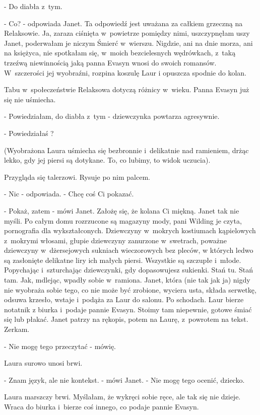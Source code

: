 \documentclass[oneside,polish,12pt,sfheadings]{mwbk}
\begin{document}
- Do diabła z~tym.

- Co? - odpowiada Janet. Ta odpowiedź jest uważana za całkiem grzeczną
na Relaksowie. Ja, zaraza ciśnięta w~powietrze pomiędzy nimi, uszczypnęłam
uszy Janet, poderwałam je niczym Śmierć w~wierszu. Nigdzie, ani na
dnie morza, ani na księżyca, nie spotkałam się, w~moich bezcielesnych
wędrówkach, z~taką trzeźwą niewinnością jaką panna Evasyn wnosi do
swoich romansów. W~szczerości jej wyobraźni, rozpina koszulę Laur
i opuszcza spodnie do kolan.

Tabu w~społeczeństwie Relaksowa dotyczą różnicy w~wieku. Panna Evasyn
już się nie uśmiecha.

- Powiedziałam, do diabła z~tym - dziewczynka powtarza agresywnie.

- Powiedziałaś ?

(Wyobrażona Laura uśmiecha się bezbronnie i~delikatnie nad ramieniem,
drżąc lekko, gdy jej piersi są dotykane. To, co lubimy, to widok uczucia).

Przygląda się talerzowi. Rysuje po nim palcem. 

- Nic - odpowiada. - Chcę coś Ci pokazać.

- Pokaż, zatem - mówi Janet. Założę się, że kolana Ci miękną. Janet
tak nie myśli. Po całym domu rozrzucone są magazyny mody, pani Wilding
je czyta, pornografia dla wykształconych. Dziewczyny w~mokrych kostiumach
kąpielowych z~mokrymi włosami, głupie dziewczyny zanurzone w~swetrach,
poważne dziewczyny w~dżersejowych sukniach wieczorowych bez pleców,
w których ledwo są zasłonięte delikatne liry ich małych piersi. Wszystkie
są szczupłe i~młode. Popychając i~szturchając dziewczynki, gdy dopasowujesz
sukienki. Stań tu. Stań tam. Jak, mdlejąc, wpadły sobie w~ramiona.
Janet, która (nie tak jak ja) nigdy nie wyobraża sobie tego, co nie
może być zrobione, wyciera usta, składa serwetkę, odsuwa krzesło,
wstaje i~podąża za Laur do salonu. Po schodach. Laur bierze notatnik
z biurka i~podaje pannie Evasyn. Stoimy tam niepewnie, gotowe śmiać
się lub płakać. Janet patrzy na rękopis, potem na Laurę, z~powrotem
na tekst. Zerkam.

- Nie mogę tego przeczytać - mówię.

Laura surowo unosi brwi.

- Znam język, ale nie kontekst. - mówi Janet. - Nie mogę tego ocenić, dziecko.

Laura marszczy brwi. Myślałam, że wykręci sobie ręce, ale tak się
nie dzieje. Wraca do biurka i~bierze coś innego, co podaje pannie
Evasyn.
\end{document}
